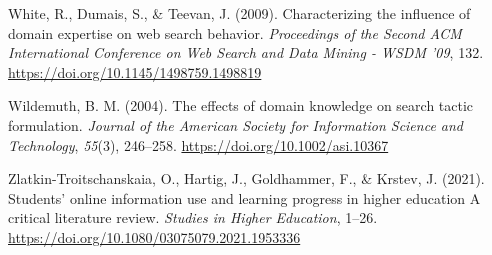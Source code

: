 \documentclass[a4paper, nobind]{templates/ociamthesis}
\newlength{\cslhangindent}
\newenvironment{CSLReferences}[2] %
 {%
  \setlength{\parindent}{0pt}
  \ifodd #1
  \let\oldpar\par
  \def\par{\hangindent=\cslhangindent\oldpar}
  \fi
  \setlength{\parskip}{1mm}
  \setlength{\baselineskip}{6mm}
 }%
 {}
\begin{document}
\begin{CSLReferences}{1}{0}
\leavevmode{}%
White, R., Dumais, S., \& Teevan, J. (2009). Characterizing the influence of domain expertise on web search behavior. \emph{Proceedings of the {Second ACM International Conference} on {Web Search} and {Data Mining} - {WSDM} '09}, 132. \url{https://doi.org/10.1145/1498759.1498819}

\leavevmode{}%
Wildemuth, B. M. (2004). The effects of domain knowledge on search tactic formulation. \emph{Journal of the American Society for Information Science and Technology}, \emph{55}(3), 246--258. \url{https://doi.org/10.1002/asi.10367}

\leavevmode{}%
Zlatkin-Troitschanskaia, O., Hartig, J., Goldhammer, F., \& Krstev, J. (2021). Students' online information use and learning progress in higher education \textendash{} {A} critical literature review. \emph{Studies in Higher Education}, 1--26. \url{https://doi.org/10.1080/03075079.2021.1953336}

\end{CSLReferences}

\end{document}
